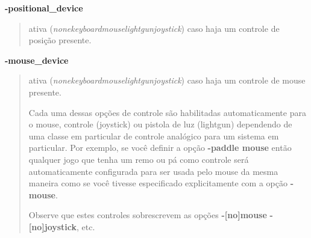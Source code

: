 \documentclass[letterpaper,10pt,brazil]{sphinxmanual}
\begin{document}
\label{commandline/commandline-all:mame-commandline-positionaldevice}
\textbf{-positional\_device}
\begin{quote}

ativa (\emph{none\textbar{}keyboard\textbar{}mouse\textbar{}lightgun\textbar{}joystick})
caso haja um controle de posição presente.
\end{quote}
\label{commandline/commandline-all:mame-commandline-mousedevice}
\textbf{-mouse\_device}
\begin{quote}

ativa (\emph{none\textbar{}keyboard\textbar{}mouse\textbar{}lightgun\textbar{}joystick})
caso haja um controle de mouse presente.

Cada uma dessas opções de controle são habilitadas automaticamente
para o mouse, controle (joystick) ou pistola de luz (lightgun)
dependendo de uma classe em particular de controle analógico para um
sistema em particular. Por exemplo, se você definir a opção
\textbf{-paddle mouse} então qualquer jogo que tenha um remo ou pá como
controle será automaticamente configurada para ser usada pelo mouse
da mesma maneira como se você tivesse especificado explicitamente
com a opção \textbf{-mouse}.

Observe que estes controles sobrescrevem as opções \textbf{-{[}no{]}mouse}
\textbf{-{[}no{]}joystick}, etc.
\end{quote}
\end{document}
